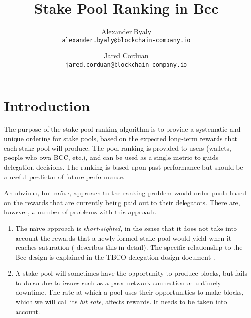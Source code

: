 \documentclass[11pt,a4paper,dvipsnames,twosided]{article}
\begin{document}
\title{Stake Pool Ranking in Bcc}

\author{Alexander Byaly  \\ {\small \texttt{alexander.byaly@blockchain-company.io}} \\
   \and Jared Corduan  \\ {\small \texttt{jared.corduan@blockchain-company.io}}}



\setlength{\parindent}{0pt}
\setlength{\parskip}{12pt plus 3pt minus 2pt}

\maketitle

\section{Introduction}

The purpose of the stake pool ranking algorithm is to provide a systematic and unique ordering for stake pools,
based on the expected long-term rewards that each stake pool will produce.
The pool ranking is provided to users (wallets, people who own BCC, etc.), and can be used as a single
metric to guide delegation decisions.
The ranking is based upon past performance but should be a useful predictor of future performance.

An obvious, but na\"{i}ve, approach to the ranking problem would order pools based on the rewards that are
currently being paid out to their delegators.  There are, however, a number of problems with this approach.

\begin{enumerate}
  \item
    The na\"{i}ve approach is \emph{short-sighted}, in the sense that it does not take into
    account the rewards that a newly formed stake pool would yield when it reaches saturation (\cite{bkks2018} describes this in detail).
    The specific relationship to the Bcc design is explained in the TBCO delegation design document \cite[Section 5.6]{delegation_design}.
  \item
    A stake pool will sometimes have the opportunity to produce blocks,
    but fails to do so due to issues such as a poor network connection or untimely downtime. The rate at
    which a pool uses their opportunities to make blocks, which we will call its \emph{hit rate}, affects rewards.
    It needs to be taken into account.
\end{enumerate}
\end{document}
